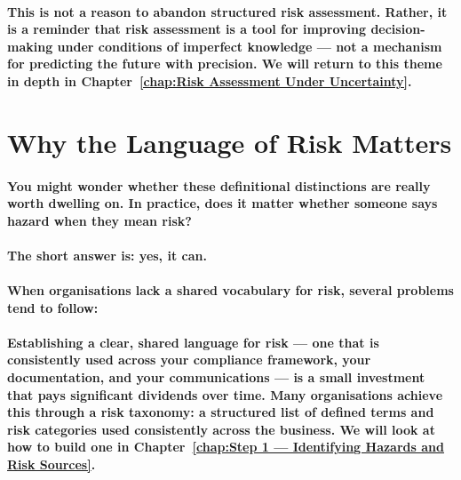 \paragraph{This is not a reason to abandon structured risk assessment. Rather, it is a reminder that risk assessment is a tool for improving decision-making under conditions of imperfect knowledge — not a mechanism for predicting the future with precision. We will return to this theme in depth in Chapter~\ref{chap:Risk Assessment Under Uncertainty}.}

\section{Why the Language of Risk Matters}

\paragraph{You might wonder whether these definitional distinctions are really worth dwelling on. In practice, does it matter whether someone says hazard when they mean risk?}

\paragraph{The short answer is: yes, it can.}

\paragraph{When organisations lack a shared vocabulary for risk, several problems tend to follow:}

\begin{itemize}
\end{itemize}

\paragraph{Establishing a clear, shared language for risk — one that is consistently used across your compliance framework, your documentation, and your communications — is a small investment that pays significant dividends over time. Many organisations achieve this through a risk taxonomy: a structured list of defined terms and risk categories used consistently across the business. We will look at how to build one in Chapter~\ref{chap:Step 1 — Identifying Hazards and Risk Sources}.}

